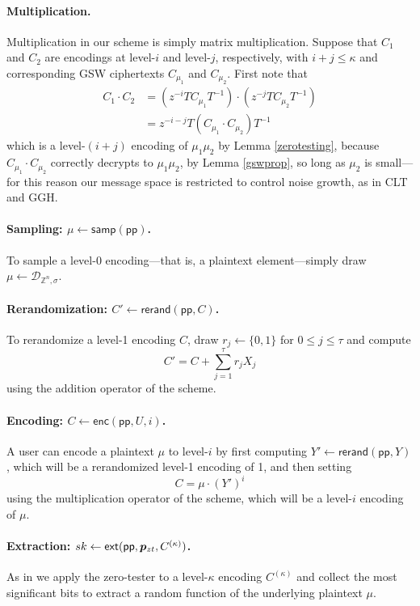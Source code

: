 \paragraph{Multiplication.}  Multiplication in our scheme is simply matrix multiplication.  Suppose that $C_1$ and $C_2$ are encodings at level-$i$ and level-$j$, respectively, with $i+j \leq \kappa$ and corresponding GSW ciphertexts $C_{\mu_1}$ and $C_{\mu_2}$.  First note that
\begin{align*}
C_1\cdot C_2 &= (z^{-i}TC_{\mu_1}T^{-1})\cdot(z^{-j}TC_{\mu_2}T^{-1})\\
&= z^{-i-j}T(C_{\mu_1}\cdot C_{\mu_2})T^{-1}
\end{align*}
which is a level-$(i+j)$ encoding of $\mu_1\mu_2$ by Lemma \ref{zerotesting}, because $C_{\mu_1} \cdot C_{\mu_2}$ correctly decrypts to $\mu_1\mu_2$, by Lemma \ref{gswprop}, so long as $\mu_2$ is small---for this reason our message space is restricted to control noise growth, as in CLT and GGH.

\paragraph{Sampling:  $\mu \leftarrow \mathsf{samp}(\mathsf{pp})$.}  To sample a level-0 encoding---that is, a plaintext element---simply draw $\mu\leftarrow \mathcal{D}_{\mathbb{Z}^n, \sigma}$.

\paragraph{Rerandomization: $C' \leftarrow \mathsf{rerand}(\mathsf{pp}, C)$.}  To rerandomize a level-1 encoding $C$, draw $r_j \leftarrow \{0,1\}$ for $0 \leq j \leq \tau$ and compute $$C' = C + \sum_{j=1}^\tau r_jX_j$$ using the addition operator of the scheme.

\paragraph{Encoding:  $C \leftarrow \mathsf{enc}(\mathsf{pp},U,i)$.}  A user can encode a plaintext $\mu$ to level-$i$ by first computing $Y' \leftarrow \mathsf{rerand}(\mathsf{pp}, Y)$, which will be a rerandomized level-1 encoding of 1, and then setting $$C = \mu \cdot \left(Y'\right)^i$$ using the multiplication operator of the scheme, which will be a level-$i$ encoding of $\mu$.

\paragraph{Extraction: $sk \leftarrow \mathsf{ext}(\mathsf{pp}, \bm{p}_{zt}, C^{(\kappa)})$.}  As in \cite{ggh13a, clt15} we apply the zero-tester to a level-$\kappa$ encoding $C^{(\kappa)}$ and collect the most significant bits to extract a random function of the underlying plaintext $\mu$.

